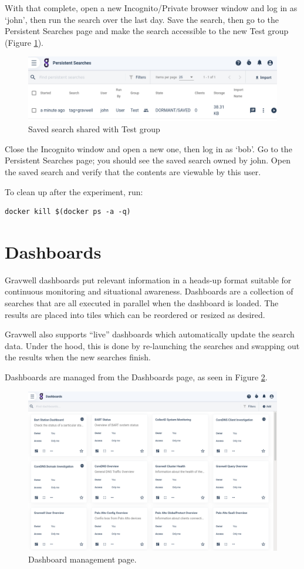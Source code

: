 With that complete, open a new Incognito/Private browser window and log
in as `john', then run the search  over the last day. Save
the search, then go to the Persistent Searches page and make the search
accessible to the new Test group (Figure \ref{fig:lab-shared-search}).

\begin{figure}
	\includegraphics[width=0.7\linewidth]{images/lab-shared-search.png}
	\caption{Saved search shared with Test group}
	\label{fig:lab-shared-search}
\end{figure}

Close the Incognito window and open a new one, then log in as `bob'. Go
to the Persistent Searches page; you should see the saved search owned
by john. Open the saved search and verify that the contents are viewable by this
user.

To clean up after the experiment, run:

\begin{Verbatim}[breaklines=true]
docker kill $(docker ps -a -q)
\end{Verbatim}


\clearpage
\section{Dashboards}
\label{sec:dashboards}
Gravwell dashboards put relevant information in a
heads-up format suitable for continuous monitoring and situational
awareness. Dashboards are a collection of searches that are all executed in
parallel when the dashboard is loaded. The results are placed into tiles
which can be reordered or resized as desired.

Gravwell also supports ``live'' dashboards which automatically update
the search data. Under the hood, this is done by re-launching the
searches and swapping out the results when the new searches finish.

Dashboards are managed from the Dashboards page, as seen in Figure \ref{fig:dashboards}. 

\begin{figure}
	\includegraphics[width=0.8\linewidth]{images/dashboards.png}
	\caption{Dashboard management page.}
	\label{fig:dashboards}
\end{figure}

